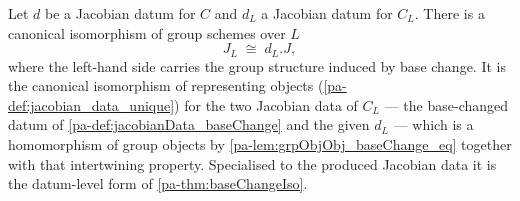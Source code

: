 \begin{definition}
  \label{pa-def:baseChangeIsoOfData}
  \leanok

  Let \(d\) be a Jacobian datum for \(C\) and \(d_L\) a Jacobian datum for \(C_L\). There is a
  canonical isomorphism of group schemes over \(L\)
  \[
    J_L \;\cong\; d_L.J ,
  \]
  where the left-hand side carries the group structure induced by base change. It is the canonical
  isomorphism of representing objects (\ref{pa-def:jacobian_data_unique}) for the two Jacobian data of
  \(C_L\) --- the base-changed datum of \ref{pa-def:jacobianData_baseChange} and the given \(d_L\) ---
  which is a homomorphism of group objects by \ref{pa-lem:grpObjObj_baseChange_eq} together with that
  intertwining property. Specialised to the produced Jacobian data it is the datum-level form of
  \ref{pa-thm:baseChangeIso}.
\end{definition}
